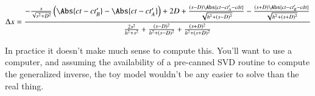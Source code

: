\begin{equation}\label{eqn:relativisticElectrodynamicsA1:400}
\Delta x =
\frac{
   -\frac{s}{\sqrt{s^2 + D^2}} \left( \Abs{ ct - c t_B' } - \Abs{ c t - c t_A'} \right) +2 D
   + \frac{(s - D)\Abs{c t - c t_A' - c \delta t} }{ \sqrt{ h^2 + (s - D)^2 } } 
   - \frac{(s + D)\Abs{c t - c t_B' - c \delta t} }{ \sqrt{ h^2 + (s + D)^2 } } }
{
   \frac{2 s^2}{h^2 + s^2}
   +\frac{(s - D)^2}{h^2 + (s -D)^2}
   +\frac{(s + D)^2}{h^2 + (s +D)^2}
}
\end{equation}

In practice it doesn't make much sense to compute this.  You'll want to use a computer, and assuming the availability of a pre-canned SVD routine to compute the generalized inverse, the toy model wouldn't be any easier to solve than the real thing.



%
%
%

\EndArticle
